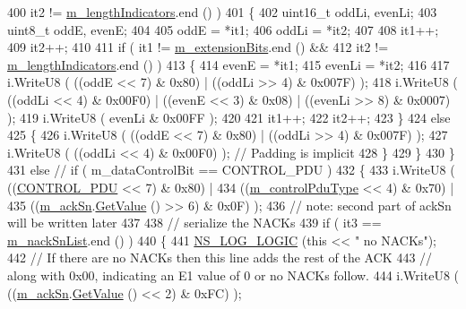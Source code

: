 \begin{DoxyCode}
400               it2 != \hyperlink{classns3_1_1LteRlcAmHeader_af844efce56d400df7aa9224c4df37f84}{m\_lengthIndicators}.end () )
401         \{
402           uint16\_t oddLi, evenLi;
403           uint8\_t oddE, evenE;
404 
405           oddE = *it1;
406           oddLi = *it2;
407 
408           it1++;
409           it2++;
410 
411           \textcolor{keywordflow}{if} ( it1 != \hyperlink{classns3_1_1LteRlcAmHeader_a74d6d748a89f21632a351e02adb7c0ad}{m\_extensionBits}.end () &&
412               it2 != \hyperlink{classns3_1_1LteRlcAmHeader_af844efce56d400df7aa9224c4df37f84}{m\_lengthIndicators}.end () )
413             \{
414               evenE = *it1;
415               evenLi = *it2;
416 
417               i.WriteU8 ( ((oddE << 7) & 0x80) | ((oddLi >> 4) & 0x007F) );
418               i.WriteU8 ( ((oddLi << 4) & 0x00F0) | ((evenE << 3) & 0x08) | ((evenLi >> 8) & 0x0007) );
419               i.WriteU8 ( evenLi & 0x00FF );
420 
421               it1++;
422               it2++;
423             \}
424           \textcolor{keywordflow}{else}
425             \{
426               i.WriteU8 ( ((oddE << 7) & 0x80) | ((oddLi >> 4) & 0x007F) );
427               i.WriteU8 ( ((oddLi << 4) & 0x00F0) ); \textcolor{comment}{// Padding is implicit}
428             \}
429         \}
430     \}
431   \textcolor{keywordflow}{else} \textcolor{comment}{// if ( m\_dataControlBit == CONTROL\_PDU )}
432     \{
433       i.WriteU8 ( ((\hyperlink{classns3_1_1LteRlcAmHeader_a7ccc7b1df0021a5e891e02380cd82cd6aa624cc11eeb1a0c898a9483a78010794}{CONTROL\_PDU} << 7) & 0x80) |
434                   ((\hyperlink{classns3_1_1LteRlcAmHeader_a9e0eb15e5fc0eeda48c0b62cd5f3fd1d}{m\_controlPduType} << 4) & 0x70) |
435                   ((\hyperlink{classns3_1_1LteRlcAmHeader_a95d8ee6ccdb69d68bd28c8a8f3257b1c}{m\_ackSn}.\hyperlink{classns3_1_1SequenceNumber10_a9dcaea04bc415e169e7e0020ce579d01}{GetValue} () >> 6) & 0x0F) );
436       \textcolor{comment}{// note: second part of ackSn will be written later}
437 
438       \textcolor{comment}{// serialize the NACKs}
439       \textcolor{keywordflow}{if} ( it3 == \hyperlink{classns3_1_1LteRlcAmHeader_ae9feb3d09099ed90ed014d3f0fa8591b}{m\_nackSnList}.end () ) 
440         \{
441           \hyperlink{group__logging_ga88acd260151caf2db9c0fc84997f45ce}{NS\_LOG\_LOGIC} (\textcolor{keyword}{this} << \textcolor{stringliteral}{" no NACKs"});
442            \textcolor{comment}{// If there are no NACKs then this line adds the rest of the ACK}
443            \textcolor{comment}{// along with 0x00, indicating an E1 value of 0 or no NACKs follow.}
444            i.WriteU8 ( ((\hyperlink{classns3_1_1LteRlcAmHeader_a95d8ee6ccdb69d68bd28c8a8f3257b1c}{m\_ackSn}.\hyperlink{classns3_1_1SequenceNumber10_a9dcaea04bc415e169e7e0020ce579d01}{GetValue} () << 2) & 0xFC) );

\end{DoxyCode}
